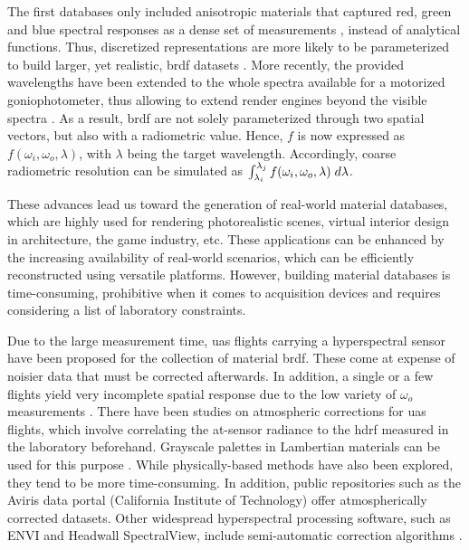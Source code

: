 The first databases only included anisotropic materials that captured red, green and blue spectral responses as a dense set of measurements \cite{matusik_data-driven_2003}, instead of analytical functions. Thus, discretized representations are more likely to be parameterized to build larger, yet realistic, \acrshort{brdf} datasets \cite{serrano_intuitive_2016}. More recently, the provided wavelengths have been extended to the whole spectra available for a motorized goniophotometer, thus allowing to extend render engines beyond the visible spectra \cite{dupuy_adaptive_2018}. As a result, \acrshort{brdf} are not solely parameterized through two spatial vectors, but also with a radiometric value. Hence, $f$ is now expressed as $f(\omega_i, \omega_o, \lambda)$, with $\lambda$ being the target wavelength. Accordingly, coarse radiometric resolution can be simulated as $\int_{\lambda_i}^{\lambda_j} f(\omega_i, \omega_o, \lambda) \hspace{1mm} d\lambda$. 

These advances lead us toward the generation of real-world material databases, which are highly used for rendering photorealistic scenes, virtual interior design in architecture, the game industry, etc. These applications can be enhanced by the increasing availability of real-world scenarios, which can be efficiently reconstructed using versatile platforms. However, building material databases is time-consuming, prohibitive when it comes to acquisition devices and requires considering a list of laboratory constraints. 

Due to the large measurement time, \acrshort{uas} flights carrying a hyperspectral sensor have been proposed for the collection of material \acrshort{brdf}. These come at expense of noisier data that must be corrected afterwards. In addition, a single or a few flights yield very incomplete spatial response due to the low variety of $\omega_o$ measurements \cite{jurado_efficient_2022}. There have been studies on atmospheric corrections for \acrshort{uas} flights, which involve correlating the at-sensor radiance to the \acrshort{hdrf} measured in the laboratory beforehand. Grayscale palettes in Lambertian materials can be used for this purpose  \cite{lucieer_hyperuasimaging_2014}. While physically-based methods have also been explored, they tend to be more time-consuming. In addition, public repositories such as the Aviris data portal (California Institute of Technology) \cite{california_institute_of_technology_aviris_nodate} offer atmospherically corrected datasets. Other widespread hyperspectral processing software, such as ENVI and Headwall SpectralView, include semi-automatic correction algorithms \cite{queally_flexbrdf_2022, jia_kernel-driven_2020, sagan_data-driven_2022}.

